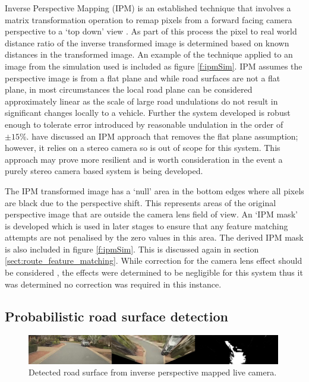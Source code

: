 \documentclass[]{aiaa-tc}%
\begin{document}
Inverse Perspective Mapping (IPM) is an established technique that involves a matrix transformation operation to remap pixels from a forward facing camera perspective to a `top down' view \citep{compVisionTextbook}. As part of this process the pixel to real world distance ratio of the inverse transformed image is determined based on known distances in the transformed image. An example of the technique applied to an image from the simulation used is included as figure \ref{f:ipmSim}. IPM assumes the perspective image is from a flat plane \citep{ipmForLaneTracking} and while road surfaces are not a flat plane, in most circumstances the local road plane can be considered approximately linear as the scale of large road undulations do not result in significant changes locally to a vehicle. Further the system developed is robust enough to tolerate error introduced by reasonable undulation in the order of $\pm 15\%$. \citet{extendedIPM} have discussed an IPM approach that removes the flat plane assumption; however, it relies on a stereo camera so is out of scope for this system. This approach may prove more resilient and is worth consideration in the event a purely stereo camera based system is being developed. 

The IPM transformed image has a `null' area in the bottom edges where all pixels are black due to the perspective shift. This represents areas of the original perspective image that are outside the camera lens field of view. An `IPM mask' is developed which is used in later stages to ensure that any feature matching attempts are not penalised by the zero values in this area. The derived IPM mask is also included in figure \ref{f:ipmSim}. This is discussed again in section \ref{sect:route_feature_matching}. While correction for the camera lens effect should be considered \citep{fisheyeEffect}, the effects were determined to be negligible for this system thus it was determined no correction was required in this instance.

\subsection{Probabilistic road surface detection}\label{s:histogramRoadDetection}

\begin{figure}
	\includegraphics[width=0.99\textwidth]{RoadDetection/histRoadLive.png}
	\caption{Detected road surface from inverse perspective mapped live camera.}
	\label{f:histRoadLive}
\end{figure}
\end{document}
